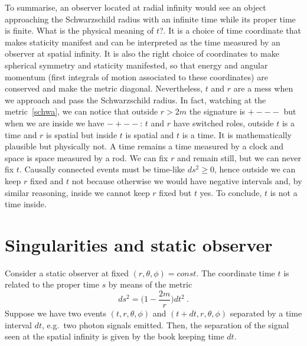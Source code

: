     To summarise, an observer located at radial infinity would see an object approaching the Schwarzschild radius with an infinite time while its proper time is finite. What is the physical meaning of $t$?. It is a choice of time coordinate that makes staticity manifest and can be interpreted as the time measured by an observer at spatial infinity. It is also the right choice of coordinates to make spherical symmetry and staticity manifested, so that energy and angular momentum (first integrals of motion associated to these coordinates) are conserved and make the metric diagonal. Nevertheless, $t$ and $r$ are a mess when we approach and pass the Schwarzschild radius. In fact, watching at the metric~\eqref{schwa}, we can notice that outside $r>2m$ the signature is $+---$ but when we are inside we have $-+--$: $t$ and $r$ have switched roles, outside $t$ is a time and $r$ is spatial but inside $t$ is spatial and $t$ is a time. It is mathematically plausible but physically not. A time remains a time measured by a clock and space is space measured by a rod. We can fix $r$ and remain still, but we can never fix $t$. Causally connected events must be time-like $ds^2 \geq 0$, hence outside we can keep $r$ fixed and $t$ not because otherwise we would have negative intervals and, by similar reasoning, inside we cannot keep $r$ fixed but $t$ yes. To conclude, $t$ is not a time inside.

\section{Singularities and static observer}

    Consider a static observer at fixed $(r, \theta, \phi) = const$. The coordinate time $t$ is related to the proper time $s$ by means of the metric 
    \begin{equation*}
        ds^2 = \Big ( 1 - \frac{2m}{r}\Big) dt^2 ~.
    \end{equation*}
    Suppose we have two events $(t, r, \theta, \phi)$ and $(t + dt, r, \theta, \phi)$ separated by a time interval $dt$, e.g.~two photon signals emitted. Then, the separation of the signal seen at the spatial infinity is given by the book keeping time $dt$.

